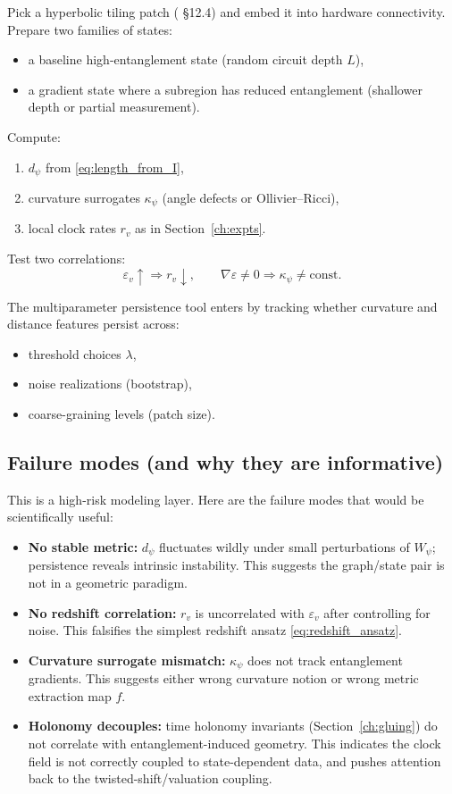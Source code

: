 \documentclass[11pt,oneside]{amsbook}
\numberwithin{equation}{section}
\theoremstyle{plain}
\theoremstyle{definition}
\theoremstyle{remark}
\begin{document}
Pick a hyperbolic tiling patch ( \S12.4) and embed it into hardware connectivity.
Prepare two families of states:
\begin{itemize}
\item a baseline high-entanglement state (random circuit depth $L$),
\item a gradient state where a subregion has reduced entanglement (shallower depth or partial measurement).
\end{itemize}

Compute:
\begin{enumerate}
\item $d_\psi$ from \eqref{eq:length_from_I},
\item curvature surrogates $\kappa_\psi$ (angle defects or Ollivier--Ricci),
\item local clock rates $r_v$ as in Section~\ref{ch:expts}.
\end{enumerate}

Test two correlations:
\[
\varepsilon_v \uparrow \Longrightarrow r_v \downarrow,
\qquad
\nabla \varepsilon \neq 0 \Longrightarrow \kappa_\psi \neq \text{const}.
\]

The multiparameter persistence tool enters by tracking whether curvature and distance features persist across:
\begin{itemize}
\item threshold choices $\lambda$,
\item noise realizations (bootstrap),
\item coarse-graining levels (patch size).
\end{itemize}

\subsection{Failure modes (and why they are informative)}
\label{sec:gravity_fail}

This is a high-risk modeling layer.
Here are the failure modes that would be scientifically useful:

\begin{itemize}
\item \textbf{No stable metric:} $d_\psi$ fluctuates wildly under small perturbations of $W_\psi$; persistence reveals intrinsic instability.  This suggests the graph/state pair is not in a geometric paradigm.
\item \textbf{No redshift correlation:} $r_v$ is uncorrelated with $\varepsilon_v$ after controlling for noise.  This falsifies the simplest redshift ansatz \eqref{eq:redshift_ansatz}.
\item \textbf{Curvature surrogate mismatch:} $\kappa_\psi$ does not track entanglement gradients.  This suggests either wrong curvature notion or wrong metric extraction map $f$.
\item \textbf{Holonomy decouples:} time holonomy invariants (Section~\ref{ch:gluing}) do not correlate with entanglement-induced geometry.  This indicates the clock field is not correctly coupled to state-dependent data, and pushes attention back to the twisted-shift/valuation coupling.
\end{itemize}
\end{document}
